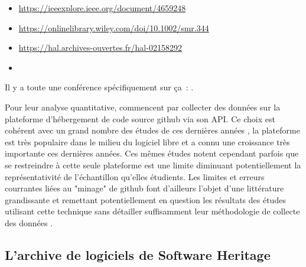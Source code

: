 
\begin{itemize}
    \item \url{https://ieeexplore.ieee.org/document/4659248}
    \item \url{https://onlinelibrary.wiley.com/doi/10.1002/smr.344}
    \item \url{https://hal.archives-ouvertes.fr/hal-02158292}
    \item {}
\end{itemize}

Il y a toute une conférence spécifiquement sur ça : .

Pour leur analyse quantitative, \textcite{signals-2019} commencent par collecter des données sur la plateforme
d'hébergement de code source \gls{github} via son \gls{API}. Ce choix est cohérent avec un grand nombre des
études de ces dernières années , la plateforme est très populaire dans le
milieu du logiciel libre et a connu une croissance très importante ces dernières années. Ces mêmes études
notent cependant parfois que se restreindre à cette seule plateforme est une limite diminuant potentiellement
la représentativité de l'échantillon qu'elles étudients. Les limites et erreurs courrantes liées au "minage"
de \gls{github} font d'ailleurs l'objet d'une littérature grandissante et remettant potentiellement en
question les résultats des études utilisant cette technique sans détailler suffisamment leur méthodologie de
collecte des données \parencites{mining-github-2014}{penumbra-oss-2022}.

\subsection{L'archive de logiciels de Software Heritage}


